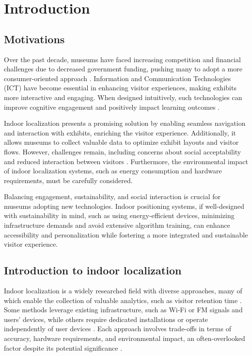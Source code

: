 \chapter{Introduction}
\label{chap:introduction}

\section{Motivations}



Over the past decade, museums have faced increasing competition and financial challenges due to decreased government funding, pushing many to adopt a more consumer-oriented approach \cite{chiappa_emotions_2014}. Information and Communication Technologies (ICT) have become essential in enhancing visitor experiences, making exhibits more interactive and engaging. When designed intuitively, such technologies can improve cognitive engagement and positively impact learning outcomes \cite{pallud_impact_2017}.

Indoor localization presents a promising solution by enabling seamless navigation and interaction with exhibits, enriching the visitor experience. Additionally, it allows museums to collect valuable data to optimize exhibit layouts and visitor flows. However, challenges remain, including concerns about social acceptability and reduced interaction between visitors \cite{tom_dieck_enhancing_2018}. Furthermore, the environmental impact of indoor localization systems, such as energy consumption and hardware requirements, must be carefully considered.

Balancing engagement, sustainability, and social interaction is crucial for museums adopting new technologies. Indoor positioning systems, if well-designed with sustainability in mind, such as using energy-efficient devices, minimizing infrastructure demands and avoid extensive algorithm training, can enhance accessibility and personalization while fostering a more integrated and sustainable visitor experience.

\section{Introduction to indoor localization}


Indoor localization is a widely researched field with diverse approaches, many of which enable the collection of valuable analytics, such as visitor retention time \cite{spachos_ble_2020}. Some methods leverage existing infrastructure, such as Wi-Fi or FM signals and users' devices, while others require dedicated installations or operate independently of user devices \cite{ali_locali_2017}. Each approach involves trade-offs in terms of accuracy, hardware requirements, and environmental impact, an often-overlooked factor despite its potential significance \cite{mainetti_survey_2014}.

